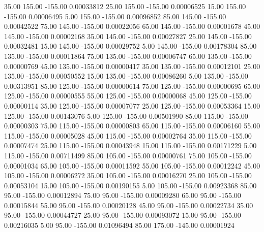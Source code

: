      35.00    155.00   -155.00     0.00033812
     25.00    155.00   -155.00     0.00006525
     15.00    155.00   -155.00     0.00006495
      5.00    155.00   -155.00     0.00096852
     85.00    145.00   -155.00     0.00042522
     75.00    145.00   -155.00     0.00022056
     65.00    145.00   -155.00     0.00001678
     45.00    145.00   -155.00     0.00002168
     35.00    145.00   -155.00     0.00027827
     25.00    145.00   -155.00     0.00032481
     15.00    145.00   -155.00     0.00029752
      5.00    145.00   -155.00     0.00178304
     85.00    135.00   -155.00     0.00011864
     75.00    135.00   -155.00     0.00006747
     65.00    135.00   -155.00     0.00000769
     45.00    135.00   -155.00     0.00000417
     35.00    135.00   -155.00     0.00012101
     25.00    135.00   -155.00     0.00050552
     15.00    135.00   -155.00     0.00086260
      5.00    135.00   -155.00     0.00313951
     85.00    125.00   -155.00     0.00000614
     75.00    125.00   -155.00     0.00000695
     65.00    125.00   -155.00     0.00000555
     55.00    125.00   -155.00     0.00000068
     45.00    125.00   -155.00     0.00000114
     35.00    125.00   -155.00     0.00007077
     25.00    125.00   -155.00     0.00053364
     15.00    125.00   -155.00     0.00143076
      5.00    125.00   -155.00     0.00501990
     85.00    115.00   -155.00     0.00000303
     75.00    115.00   -155.00     0.00000803
     65.00    115.00   -155.00     0.00006160
     55.00    115.00   -155.00     0.00005028
     45.00    115.00   -155.00     0.00002764
     35.00    115.00   -155.00     0.00007474
     25.00    115.00   -155.00     0.00043948
     15.00    115.00   -155.00     0.00171229
      5.00    115.00   -155.00     0.00711499
     85.00    105.00   -155.00     0.00000761
     75.00    105.00   -155.00     0.00001034
     65.00    105.00   -155.00     0.00011592
     55.00    105.00   -155.00     0.00012242
     45.00    105.00   -155.00     0.00006272
     35.00    105.00   -155.00     0.00016270
     25.00    105.00   -155.00     0.00053104
     15.00    105.00   -155.00     0.00190155
      5.00    105.00   -155.00     0.00923368
     85.00     95.00   -155.00     0.00012894
     75.00     95.00   -155.00     0.00009280
     65.00     95.00   -155.00     0.00015844
     55.00     95.00   -155.00     0.00020128
     45.00     95.00   -155.00     0.00022734
     35.00     95.00   -155.00     0.00044727
     25.00     95.00   -155.00     0.00093072
     15.00     95.00   -155.00     0.00216035
      5.00     95.00   -155.00     0.01096494
     85.00    175.00   -145.00     0.00001924
